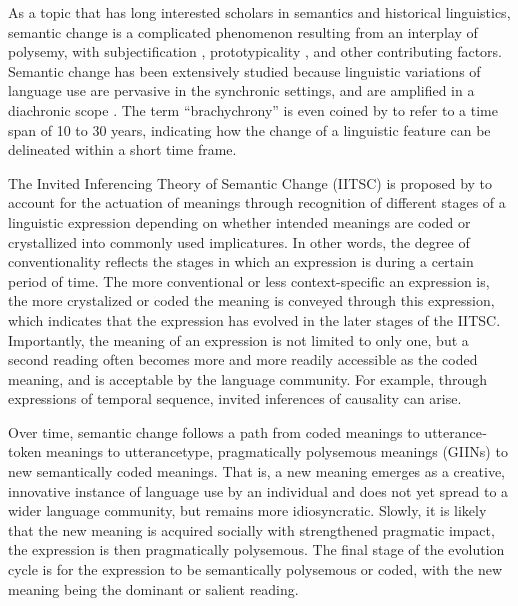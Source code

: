 As a topic that has long interested scholars in semantics and historical linguistics, semantic change is a complicated phenomenon resulting from an interplay of polysemy, with subjectification \parencite{traugott2001regularity}, prototypicality \parencite{geeraerts1997diachronic}, and other contributing factors. Semantic change has been extensively studied because linguistic variations of language use are pervasive in the synchronic settings, and are amplified in a diachronic scope \parencite{semanticincrowley2010,bowern2019semantic}. The term ``brachychrony'' is even coined by \textcite{mair1998corpora} to refer to a time span of 10 to 30 years, indicating how the change of a linguistic feature can be delineated within a short time frame.

The Invited Inferencing Theory of Semantic Change (IITSC) is proposed by \textcite[34-40]{traugott2001regularity} to account for the actuation of meanings through recognition of different stages of a linguistic expression depending on whether intended meanings are coded or crystallized into commonly used implicatures. In other words, the degree of conventionality reflects the stages in which an expression is during a certain period of time. The more conventional or less context-specific an expression is, the more crystalized or coded the meaning is conveyed through this expression, which indicates that the expression has evolved in the later stages of the IITSC. Importantly, the meaning of an expression is not limited to only one, but a second reading often becomes more and more readily accessible as the coded meaning, and is acceptable by the language community. For example, through expressions of temporal sequence, invited inferences of causality can arise.

Over time, semantic change follows a path from coded meanings to utterance­token meanings to utterance­type, pragmatically polysemous meanings (GIINs) to new semantically coded meanings. That is, a new meaning emerges as a creative, innovative instance of language use by an individual and does not yet spread to a wider language community, but remains more idiosyncratic. Slowly, it is likely that the new meaning is acquired socially with strengthened pragmatic impact, the expression is then pragmatically polysemous. The final stage of the evolution cycle is for the expression to be semantically polysemous or coded, with the new meaning being the dominant or salient reading.

